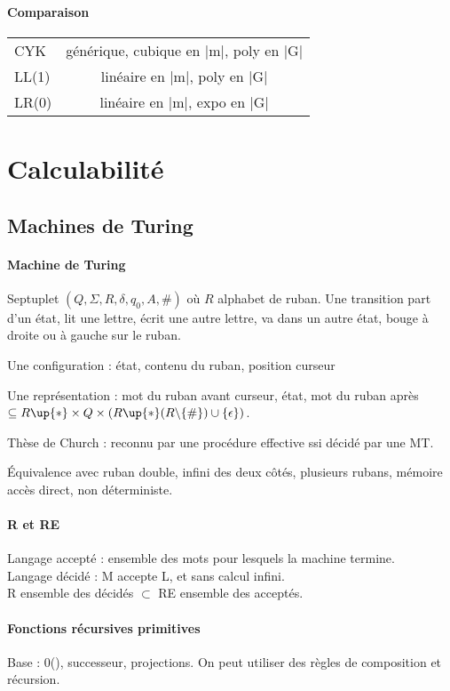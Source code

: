 \documentclass[french]{article}
\begin{document}
\paragraph{Comparaison}
\begin{tabular}{l|c}
CYK & générique, cubique en |m|, poly en |G|\\
LL(1) & linéaire en |m|, poly en |G|\\
LR(0) & linéaire en |m|, expo en |G|
\end{tabular}


\section{Calculabilité}
\subsection{Machines de Turing}
\paragraph{Machine de Turing}
Septuplet $(Q,\Sigma, R, \delta, q_0, A, \#)$ où $R$ alphabet de ruban. Une transition part d'un état, lit une lettre, écrit une autre lettre, va dans un autre état, bouge à droite ou à gauche sur le ruban.

Une configuration : état, contenu du ruban, position curseur

Une représentation : mot du ruban avant curseur, état, mot du ruban après $\subseteq R\up{*}\times Q\times(R\up{*}(R\backslash\{\#\})\cup\{\epsilon\})$.

Thèse de Church : reconnu par une procédure effective ssi décidé par une MT.

Équivalence avec ruban double, infini des deux côtés, plusieurs rubans, mémoire accès direct,  non déterministe.

\paragraph{R et RE} 
Langage accepté : ensemble des mots pour lesquels la machine termine.\\
Langage décidé : M accepte L, et sans calcul infini.\\
R ensemble des décidés $\subset$ RE ensemble des acceptés.


\paragraph{Fonctions récursives primitives}
Base : 0(), successeur, projections. On peut utiliser des règles de composition et récursion.
\end{document}
